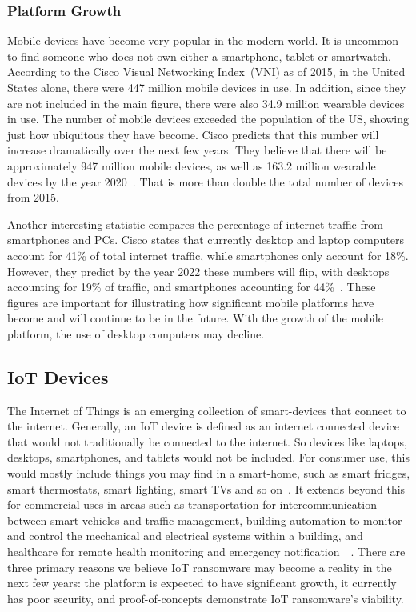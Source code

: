 \documentclass{IEEEtran}
\begin{document}
\subsubsection{Platform Growth}
Mobile devices have become very popular in the modern world. It is uncommon to find someone who does not own either a smartphone, tablet or smartwatch. According to the Cisco Visual Networking Index~(VNI) as of 2015, in the United States alone, there were 447 million mobile devices in use. In addition, since they are not included in the main figure, there were also 34.9 million wearable devices in use. The number of mobile devices exceeded the population of the US, showing just how ubiquitous they have become. Cisco predicts that this number will increase dramatically over the next few years. They believe that there will be approximately 947 million mobile devices, as well as 163.2 million wearable devices by the year 2020~\cite{RN10}. That is more than double the total number of devices from 2015. 

Another interesting statistic compares the percentage of internet traffic from smartphones and PCs. Cisco states that currently desktop and laptop computers account for 41\% of total internet traffic, while smartphones only account for 18\%. However, they predict by the year 2022 these numbers will flip, with desktops accounting for 19\% of traffic, and smartphones accounting for 44\%~\cite{RN11}. These figures are important for illustrating how significant mobile platforms have become and will continue to be in the future. With the growth of the mobile platform, the use of desktop computers may decline.


\subsection{IoT Devices}\label{iot}
The Internet of Things is an emerging collection of smart-devices that connect to the internet. Generally, an IoT device is defined as an internet connected device that would not traditionally be connected to the internet. So devices like laptops, desktops, smartphones, and tablets would not be included. For consumer use, this would mostly include things you may find in a smart-home, such as smart fridges, smart thermostats, smart lighting, smart TVs and so on~\cite{RN9}. It extends beyond this for commercial uses in areas such as transportation for intercommunication between smart vehicles and traffic management, building automation to monitor and control the mechanical and electrical systems within a building, and healthcare for remote health monitoring and emergency notification~\cite{RN4}~\cite{RN3}. There are three primary reasons we believe IoT ransomware may become a reality in the next few years: the platform is expected to have significant growth, it currently has poor security, and proof-of-concepts demonstrate IoT ransomware's viability.
\hfill \break
\end{document}

